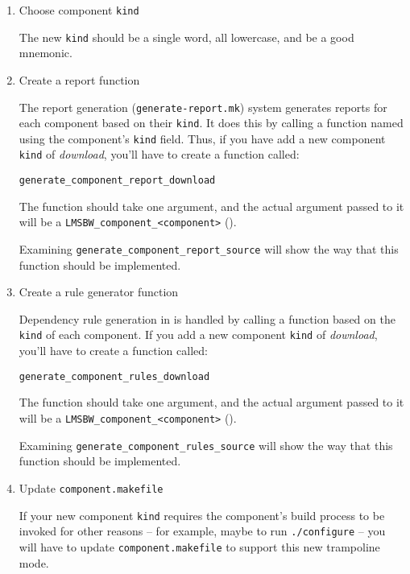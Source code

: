 \begin{enumerate}
\item Choose component \texttt{kind}

  The new \texttt{kind} should be a single word, all lowercase, and be
  a good mnemonic.

\item Create a report function

  The report generation (\texttt{generate-report.mk}) system generates
  reports for each component based on their \texttt{kind}.  It does
  this by calling a function named using the component's \texttt{kind}
  field.  Thus, if you have add a new component \texttt{kind} of
  \emph{download}, you'll have to create a function called:

\begin{verbatim}
generate_component_report_download
\end{verbatim}

  The function should take one argument, and the actual argument
  passed to it will be a \texttt{LMSBW\_component\_<component>}
  ().

  Examining \texttt{generate\_component\_report\_source} will show the
  way that this function should be implemented.

\item Create a rule generator function

  Dependency rule generation in \lmsbw is handled by calling a
  function based on the \texttt{kind} of each component.  If you add a
  new component \texttt{kind} of \emph{download}, you'll have to
  create a function called:

\begin{verbatim}
generate_component_rules_download
\end{verbatim}

  The function should take one argument, and the actual argument
  passed to it will be a \texttt{LMSBW\_component\_<component>}
  ().

  Examining \texttt{generate\_component\_rules\_source} will show the
  way that this function should be implemented.

\item Update \texttt{component.makefile}

  If your new component \texttt{kind} requires the component's build
  process to be invoked for other reasons -- for example, maybe to run
  \texttt{./configure} -- you will have to update
  \texttt{component.makefile} to support this new trampoline mode.


\end{enumerate}

